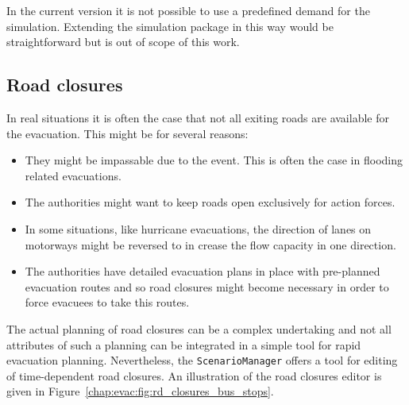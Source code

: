 In the current version it is not possible to use a predefined demand for the simulation. Extending the simulation package in this way would be straightforward but is out of scope of this work.


\subsection{Road closures}
In real situations it is often the case that not all exiting roads are available for the evacuation. This might be for several reasons:
\begin{itemize}
\item They might be impassable due to the event. This is often the case in flooding related evacuations.
\item The authorities might want to keep roads open exclusively for action forces.
\item In some situations, like hurricane evacuations, the direction of lanes on motorways might be reversed to in crease the flow capacity in one direction.
\item The authorities have detailed evacuation plans in place with pre-planned evacuation routes and so road closures might become necessary in order to force evacuees to take this routes.

\end{itemize}
The actual planning of road closures can be a complex undertaking and not all attributes of such a planning can be integrated in a simple tool for rapid evacuation planning. Nevertheless, the  \verb+ScenarioManager+ offers a tool for editing of time-dependent road closures. An illustration of the road closures editor is given in Figure~\ref{chap:evac:fig:rd_closures_bus_stops}.
